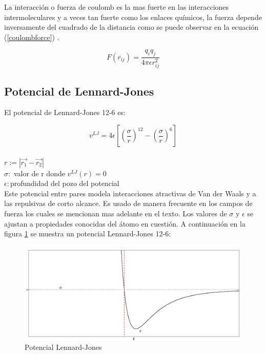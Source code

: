 La interacción o fuerza de coulomb es la mas fuerte en las interacciones intermoleculares y a veces tan fuerte como los enlaces químicos, la fuerza depende inversamente del cuadrado de la distancia como se puede observar en la ecuación (\ref{coulombforce}) \cite{ISRAELACHVILI201153}.

\begin{equation} \label{coulombforce}
    F(r_{ij}) = \frac{q_i q_j}{4\pi \epsilon r^2_{ij}}
\end{equation}

\subsection{Potencial de Lennard-Jones}

El potencial de Lennard-Jones 12-6 es:

\begin{equation} \label{LJ12-6}
    v^{LJ} = 4\epsilon \left[ \left(\frac{\sigma}{r} \right)^{12}-\left(\frac{\sigma}{r} \right)^{6}\right]
\end{equation}\\

$r:= |\vec{r_1}-\vec{r_2}|$\\

$\sigma: $ valor de r donde $v^{LJ}(r)=0$\\

$\epsilon : $profundidad del pozo del potencial\\

Este potencial entre pares modela interacciones atractivas de Van der Waals y a las repulsivas de corto alcance. Es usado de manera frecuente en los campos de fuerza los cuales se mencionan mas adelante en el texto. Los valores de $\sigma$ y $\epsilon$ se ajustan a propiedades conocidas del átomo en cuestión. A continuación en la figura \ref{fig:LJ126} se muestra un potencial Lennard-Jones 12-6:\\

\begin{figure}[!h]
    \centering
    \includegraphics[width=1\textwidth,keepaspectratio=true]{LJ.png}
    \caption{Potencial Lennard-Jones}
    \label{fig:LJ126}
\end{figure}

